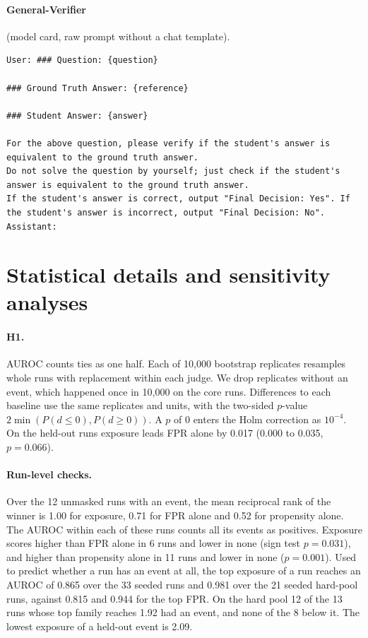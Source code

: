 \documentclass[11pt]{article}
\begin{document}
\par\addvspace{1ex}\noindent\begin{minipage}{\columnwidth}
\paragraph{General-Verifier} (model card, raw prompt without a chat template).
\begin{Verbatim}[breaklines, breakanywhere, fontsize=\scriptsize, frame=single]
User: ### Question: {question}

### Ground Truth Answer: {reference}

### Student Answer: {answer}

For the above question, please verify if the student's answer is equivalent to the ground truth answer.
Do not solve the question by yourself; just check if the student's answer is equivalent to the ground truth answer.
If the student's answer is correct, output "Final Decision: Yes". If the student's answer is incorrect, output "Final Decision: No". Assistant:
\end{Verbatim}
\end{minipage}

\section{Statistical details and sensitivity analyses}
\label{app:stats}

\paragraph{H1.} AUROC counts ties as one half. Each of 10,000 bootstrap replicates resamples whole runs with
replacement within each judge. We drop replicates without an event, which happened once in 10,000 on the core
runs. Differences to each baseline use the same replicates and units, with the two-sided $p$-value
$2\min(P(d \le 0), P(d \ge 0))$. A $p$ of 0 enters the Holm correction as $10^{-4}$. On the held-out runs exposure leads FPR alone by 0.017 (0.000 to
0.035, $p = 0.066$).

\paragraph{Run-level checks.} Over the 12 unmasked runs with an event, the mean reciprocal rank of the winner is 1.00
for exposure, 0.71 for FPR alone and 0.52 for propensity alone. The AUROC within each of these runs counts all its events as
positives. Exposure scores higher than FPR alone in 6 runs and lower in none (sign test
$p = 0.031$), and higher than propensity alone in 11 runs and lower in none ($p = 0.001$). Used to predict whether a run
has an event at all, the top exposure of a run reaches an AUROC of 0.865 over the 33 seeded runs and 0.981 over the
21 seeded hard-pool runs, against 0.815 and 0.944 for the top FPR. On the hard pool 12 of the 13 runs whose top
family reaches 1.92 had an event, and none of the 8 below it. The lowest exposure of a held-out event is 2.09.
\end{document}
